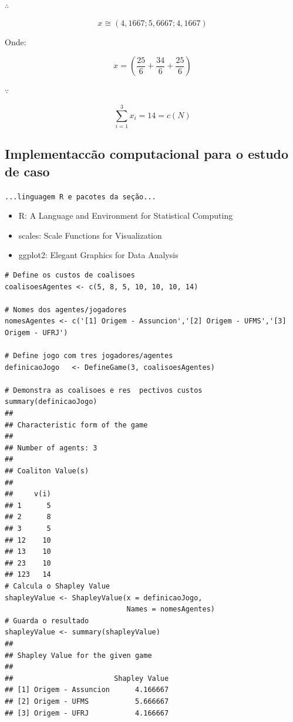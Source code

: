 \documentclass[
	article,			        %
	11pt,				          %
	oneside,			        %
	a4paper,			        %
	english,			        %
	brazil,				        %
	sumario=tradicional
]{abntex2}\usepackage[]{graphicx}\usepackage[]{color}
\makeatletter
\newenvironment{kframe}{%
 \def\at@end@of@kframe{}%
 \ifinner\ifhmode%
  \def\at@end@of@kframe{\end{minipage}}%
  \begin{minipage}{\columnwidth}%
 \fi\fi%
 \def\FrameCommand##1{\hskip\@totalleftmargin \hskip-\fboxsep
 \colorbox{shadecolor}{##1}\hskip-\fboxsep
     \hskip-\linewidth \hskip-\@totalleftmargin \hskip\columnwidth}%
 \MakeFramed {\advance\hsize-\width
   \@totalleftmargin\z@ \linewidth\hsize
   \@setminipage}}%
 {\par\unskip\endMakeFramed%
 \at@end@of@kframe}
\newenvironment{knitrout}{}{} %
\makeatother
\begin{document}
$\therefore$

\begin{equation}
 \label{eq:shaValXSolApx}
  x \cong \left (4,1667; 5,6667; 4,1667 \right ) 
\end{equation}

Onde:

\begin{equation}
 \label{eq:shaValXProva}
  x = \left ( 
        \frac{25}{6} +
        \frac{34}{6} +
        \frac{25}{6}
      \right )
\end{equation}

$\because$

\begin{equation}
 \label{eq:shaValXPorque}
 \sum_{i = 1}^{3}x_i = 14 = c(N)
\end{equation}

\subsection{Implementac{c}ão computacional para o estudo de caso}

  \texttt{\color{red}...linguagem R e pacotes da seção...}
  \begin{itemize}
    \item R: A Language and Environment for Statistical Computing \cite{R.2016}
    \item scales: Scale Functions for Visualization \cite{Wickham.2015}
    \item ggplot2: Elegant Graphics for Data Analysis \cite{Wickham.2009}
  \end{itemize}

\begin{knitrout}
\color{fgcolor}\begin{kframe}
\begin{verbatim}
# Define os custos de coalisoes
coalisoesAgentes <- c(5, 8, 5, 10, 10, 10, 14)

# Nomes dos agentes/jogadores
nomesAgentes <- c('[1] Origem - Assuncion','[2] Origem - UFMS','[3] Origem - UFRJ')

# Define jogo com tres jogadores/agentes
definicaoJogo   <- DefineGame(3, coalisoesAgentes)

# Demonstra as coalisoes e res  pectivos custos
summary(definicaoJogo)
## 
## Characteristic form of the game 
## 
## Number of agents: 3 
## 
## Coaliton Value(s) 
## 
##     v(i)
## 1      5
## 2      8
## 3      5
## 12    10
## 13    10
## 23    10
## 123   14
# Calcula o Shapley Value
shapleyValue <- ShapleyValue(x = definicaoJogo, 
                             Names = nomesAgentes)
# Guarda o resultado
shapleyValue <- summary(shapleyValue)
## 
## Shapley Value for the given game 
## 
##                        Shapley Value
## [1] Origem - Assuncion      4.166667
## [2] Origem - UFMS           5.666667
## [3] Origem - UFRJ           4.166667
\end{verbatim}
\end{kframe}
\end{knitrout}
\end{document}
